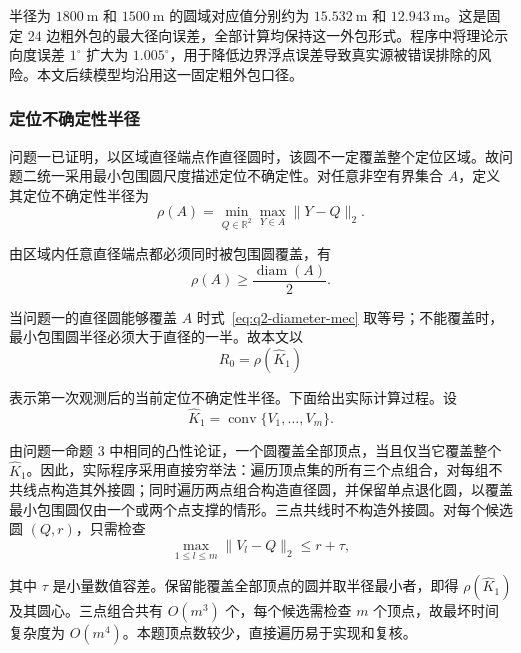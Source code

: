 \documentclass[withoutpreface,bwprint]{cumcmthesis}
\begin{document}
半径为 $1800\ \mathrm{m}$ 和 $1500\ \mathrm{m}$ 的圆域对应值分别约为 $15.532\ \mathrm{m}$ 和 $12.943\ \mathrm{m}$。这是固定 $24$ 边粗外包的最大径向误差，全部计算均保持这一外包形式。程序中将理论示向度误差 $1^\circ$ 扩大为 $1.005^\circ$，用于降低边界浮点误差导致真实源被错误排除的风险。本文后续模型均沿用这一固定粗外包口径。

\subsubsection{定位不确定性半径}

问题一已证明，以区域直径端点作直径圆时，该圆不一定覆盖整个定位区域。故问题二统一采用最小包围圆尺度描述定位不确定性。对任意非空有界集合 $A$，定义其定位不确定性半径为
\begin{equation}
  \rho(A)=\min_{Q\in\mathbb R^2}
  \max_{Y\in A}\|Y-Q\|_2.
  \label{eq:q2-mec-radius}
\end{equation}

由区域内任意直径端点都必须同时被包围圆覆盖，有
\begin{equation}
  \rho(A)\geq\frac{\operatorname{diam}(A)}{2}.
  \label{eq:q2-diameter-mec}
\end{equation}

当问题一的直径圆能够覆盖 $A$ 时式~\eqref{eq:q2-diameter-mec} 取等号；不能覆盖时，最小包围圆半径必须大于直径的一半。故本文以
\begin{equation}
  R_0=\rho(\widehat K_1)
\end{equation}

表示第一次观测后的当前定位不确定性半径。下面给出实际计算过程。设
\begin{equation}
  \widehat K_1=\operatorname{conv}\{V_1,\ldots,V_m\}.
\end{equation}

由问题一命题 3 中相同的凸性论证，一个圆覆盖全部顶点，当且仅当它覆盖整个 $\widehat K_1$。因此，实际程序采用直接穷举法：遍历顶点集的所有三个点组合，对每组不共线点构造其外接圆；同时遍历两点组合构造直径圆，并保留单点退化圆，以覆盖最小包围圆仅由一个或两个点支撑的情形。三点共线时不构造外接圆。对每个候选圆 $(Q,r)$，只需检查
\begin{equation}
  \max_{1\leq l\leq m}\|V_l-Q\|_2\leq r+\tau,
  \label{eq:q2-mec-cover-test}
\end{equation}

其中 $\tau$ 是小量数值容差。保留能覆盖全部顶点的圆并取半径最小者，即得 $\rho(\widehat K_1)$ 及其圆心。三点组合共有 $O(m^3)$ 个，每个候选需检查 $m$ 个顶点，故最坏时间复杂度为 $O(m^4)$。本题顶点数较少，直接遍历易于实现和复核。
\end{document}
